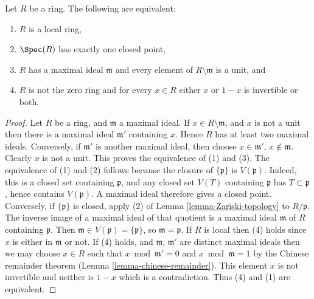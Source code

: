 \begin{lemma}
\label{lemma-characterize-local-ring}
Let $R$ be a ring. The following are equivalent:
\begin{enumerate}
\item $R$ is a local ring,
\item $\Spec(R)$ has exactly one closed point,
\item $R$ has a maximal ideal $\mathfrak m$
and every element of $R \setminus \mathfrak m$
is a unit, and
\item $R$ is not the zero ring and for every $x \in R$ either $x$
or $1 - x$ is invertible or both.
\end{enumerate}
\end{lemma}

\begin{proof}
Let $R$ be a ring, and $\mathfrak m$ a maximal ideal.
If $x \in R \setminus \mathfrak m$, and $x$ is not a unit
then there is a maximal ideal $\mathfrak m'$ containing $x$.
Hence $R$ has at least two maximal ideals. Conversely,
if $\mathfrak m'$ is another maximal ideal, then choose
$x \in \mathfrak m'$, $x \not \in \mathfrak m$. Clearly
$x$ is not a unit. This proves the equivalence of (1) and (3).
The equivalence of (1) and (2) follows because the closure of $\{\mathfrak p\}$ is
$V(\mathfrak p)$. Indeed, this is a closed set containing
$\mathfrak p$, and any closed set $V(T)$ containing $\mathfrak p$
has $T\subset\mathfrak p$, hence contains $V(\mathfrak p)$.
A maximal ideal therefore gives a closed point. Conversely, if
$\{\mathfrak p\}$ is closed, apply (2) of
Lemma \ref{lemma-Zariski-topology} to $R/\mathfrak p$.
The inverse image of a maximal ideal of that quotient is a maximal
ideal $\mathfrak m$ of $R$ containing $\mathfrak p$.
Then $\mathfrak m\in V(\mathfrak p)=\{\mathfrak p\}$,
so $\mathfrak m=\mathfrak p$.
If $R$ is local then (4) holds since $x$ is either in $\mathfrak m$
or not. If (4) holds, and $\mathfrak m$, $\mathfrak m'$ are distinct
maximal ideals then we may choose $x \in R$ such that
$x \bmod \mathfrak m' = 0$ and $x \bmod \mathfrak m = 1$
by the Chinese remainder theorem
(Lemma \ref{lemma-chinese-remainder}).
This element $x$ is not invertible and neither is $1 - x$ which is
a contradiction. Thus (4) and (1) are equivalent.
\end{proof}